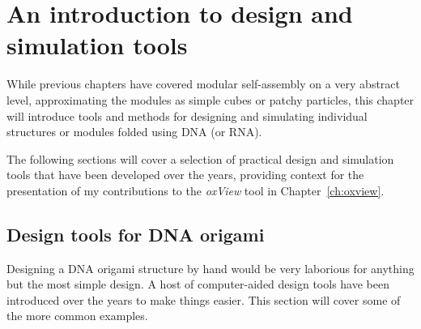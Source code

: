 
\chapter{An introduction to design and simulation tools}
\label{ch:oxview_intro}

\minitoc

While previous chapters have covered modular self-assembly on a very abstract level, approximating the modules as simple cubes or patchy particles, this chapter will introduce tools and methods for designing and simulating individual structures or modules folded using DNA (or RNA).

The following sections will cover a selection of practical design and simulation tools that have been developed over the years, providing context for the presentation of my contributions to the \emph{oxView} tool in Chapter~\ref{ch:oxview}.







\section{Design tools for DNA origami}\label{sec:design_tools}
Designing a DNA origami structure by hand would be very laborious for anything but the most simple design. A host of computer-aided design tools have been introduced over the years to make things easier. This section will cover some of the more common examples.

